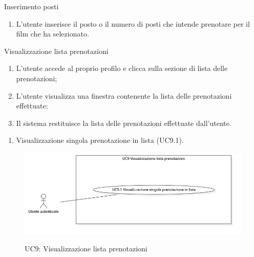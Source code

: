 \begin{usecase}{8.4}{Inserimento posti}\label{uc:inserimento-posti}
  \usecasemain{}
  
  \begin{enumerate}
    \item L'utente inserisce il posto o il numero di posti che intende prenotare per il film che ha selezionato.
  \end{enumerate}
\end{usecase}

\begin{usecase}{9}{Visualizzazione lista prenotazioni}\label{uc:lista-prenotazioni}

  \usecasemain{}
  
  \begin{enumerate}
    \item L'utente accede al proprio profilo e clicca sulla sezione di lista delle prenotazioni;
    \item L'utente visualizza una finestra contenente la lista delle prenotazioni effettuate;
    \item Il sistema restituisce la lista delle prenotazioni effettuate dall'utente.
  \end{enumerate}

  \begin{enumerate}
    \item Visualizzazione singola prenotazione in lista (UC9.1).
  \end{enumerate}
\end{usecase}

\begin{figure}[!ht] 
  \centering 
  \includegraphics[width=0.9\columnwidth, alt={Caso d'uso relativo alla visualizzazione della lista di prenotazioni da parte dell'utente}]{immagini/usecase/UC9.jpg}
  \caption{UC9: Visualizzazione lista prenotazioni}\label{fig:uc:lista-prenotazioni}
\end{figure}

